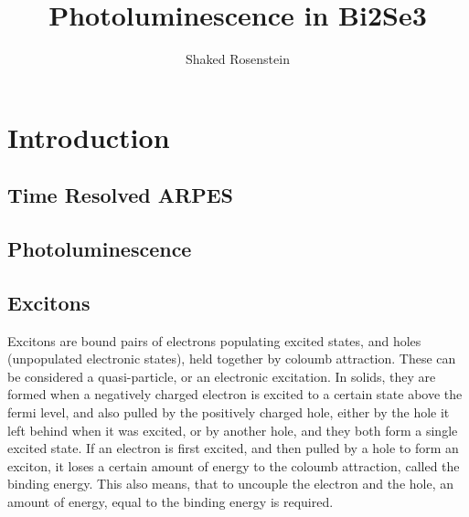 \documentclass{article}
\title{Photoluminescence in Bi2Se3}
\author{Shaked Rosenstein}
\begin{document}
\maketitle

\section{Introduction}
\subsection{Time Resolved ARPES}
\subsection{Photoluminescence}
\subsection{Excitons}

Excitons are bound pairs of electrons populating excited states, and holes (unpopulated electronic states), held together by coloumb attraction. These can be considered a quasi-particle, or an electronic excitation.
In solids, they are formed when a negatively charged electron is excited to a certain state above the fermi level, and also pulled by the positively charged hole, either by the hole it left behind when it was excited, or by another hole, and they both form a single excited state.
If an electron is first excited, and then pulled by a hole to form an exciton, it loses a certain amount of energy to the coloumb attraction, called the binding energy.
This also means, that to uncouple the electron and the hole, an amount of energy, equal to the binding energy is required.\\
\end{document}
